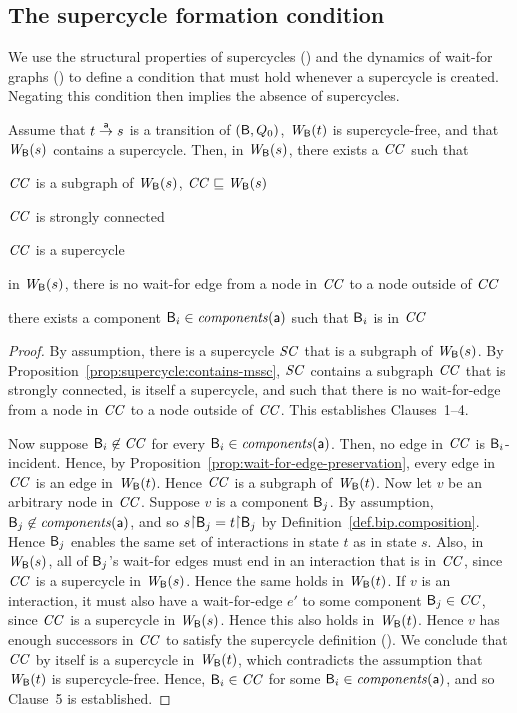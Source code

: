 


\subsection{The supercycle formation condition}

We use the structural properties of supercycles () and the dynamics of wait-for graphs ()
to define a condition that must hold whenever a supercycle is created. Negating this condition then implies the absence of supercycles.


\begin{proposition} \label{prop:supercycle-formation}
Assume that $t \goesto[\act] s$ is a transition of $(\B, Q_0)$, $\wfg{\B}{t}$ is supercycle-free, and that $\wfg{\B}{s}$
contains a supercycle.  Then, in $\wfg{\B}{s}$, there exists a $\CC$ such that
\bn
\item $\CC$ is a subgraph of $\wfg{\B}{s}$, \ie $\CC \subg \wfg{\B}{s}$
\item $\CC$ is strongly connected
\item $\CC$ is a supercycle
\item  in $\wfg{\B}{s}$, there is no wait-for edge from a node in $\CC$ to a node outside of $\CC$
\item there exists a component $\B_i \in \cmps{\act}$ such that $\B_i$ is in $\CC$
\en
\end{proposition}
%
\begin{proof}
By assumption, there is a supercycle $\SC$ that is a subgraph of $\wfg{\B}{s}$.  By Proposition~\ref{prop:supercycle:contains-mssc}, $\SC$ contains
a subgraph $\CC$ that is strongly connected, is itself a supercycle, and such that there is no wait-for-edge from a node in $\CC$ to a node outside
of $\CC$.  This establishes Clauses~1--4.

Now suppose $\B_i \not\in \CC$ for every $\B_i \in \cmps{\act}$. Then, no edge in $\CC$ is
$\B_i$-incident.  Hence, by Proposition~\ref{prop:wait-for-edge-preservation}, every edge in $\CC$
is an edge in $\wfg{\B}{t}$. Hence $\CC$ is a subgraph of $\wfg{\B}{t}$.
%
Now let $v$ be an arbitrary node in $\CC$.
%
Suppose $v$ is a component $\B_j$.  By assumption, $\B_j \not\in \cmps{\act}$, and so
$s \pj \B_j = t \pj \B_j$ by Definition~\ref{def.bip.composition}. Hence $\B_j$ enables the same set
of interactions in state $t$ as in state $s$. Also, in $\wfg{\B}{s}$, all of $\B_j$'s wait-for edges
must end in an interaction that is in $\CC$, since $\CC$ is a supercycle in $\wfg{\B}{s}$. Hence the
same holds in $\wfg{\B}{t}$.
%
If $v$ is an interaction, it must also have a wait-for-edge $e'$ to some component $\B_j \in \CC$,
since $\CC$ is a supercycle in $\wfg{\B}{s}$. Hence this also holds in $\wfg{\B}{t}$.
%
Hence $v$ has enough successors in $\CC$ to satisfy the supercycle definition ().
%
We conclude that $\CC$ by itself is a supercycle in $\wfg{\B}{t}$, which contradicts the assumption
that $\wfg{\B}{t}$ is supercycle-free. Hence, $\B_i \in \CC$ for some $\B_i \in \cmps{\act}$, and so
Clause~5 is established.  
\end {proof}



